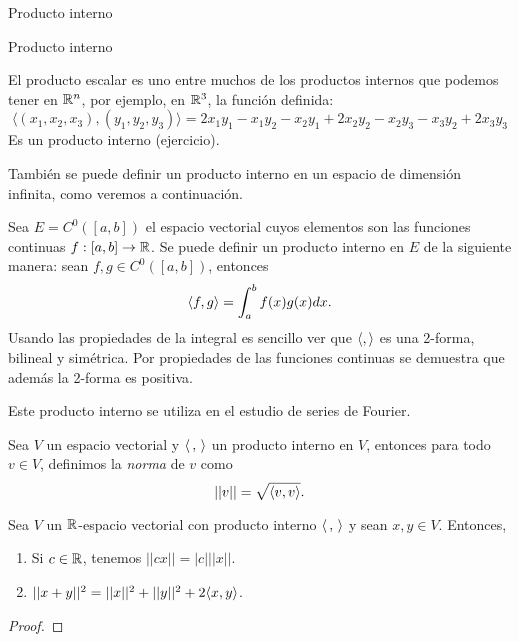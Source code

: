 \begin{chapter}{Producto interno}
\begin{section}{Producto interno}
            \begin{ejemplo*} El producto escalar es uno entre  muchos de los productos internos que podemos tener en $\mathbb R^n$, por ejemplo,  en $\mathbb R^3$,  la función definida:
                \begin{equation*}
                    \langle (x_1,x_2,x_3) , (y_1,y_2,y_3)\rangle =2x_1y_1-x_1y_2-x_2y_1+2x_2y_2-x_2y_3-x_3y_2+2x_3y_3
                \end{equation*}
                Es un producto interno (ejercicio).
            \end{ejemplo*}
        
        \begin{ejemplo*} También  se puede definir un producto interno en un espacio de dimensión infinita, como veremos a continuación.
            
            Sea $E = C^0([a,b])$ el espacio vectorial cuyos elementos son las funciones continuas $f: [a, b] \to\mathbb R$. Se puede definir un   producto interno en $E$ de la siguiente manera: sean $f,g \in  C^0([a,b])$,  entonces
            \begin{equation*}
            \langle f, g \rangle = \int_a^b f(x)g(x) dx.
            \end{equation*}
            Usando las propiedades de la integral es sencillo ver que $\langle , \rangle $ es una 2-forma, bilineal y simétrica. Por propiedades de las funciones continuas se demuestra que además la 2-forma es positiva. 
            
            Este producto interno se utiliza en el estudio de series de Fourier.
        \end{ejemplo*}
            
            
        \begin{definicion}
            Sea $V$  un espacio  vectorial y $\langle \,,\,\rangle$ un producto interno en $V$, entonces para todo $v \in V$, definimos la \textit{norma} de $v$ como 
            $$
            ||v|| = \sqrt{\langle v,v\rangle}.
            $$
        \end{definicion}
        
        \begin{proposicion} Sea $V$  un $\mathbb R$-espacio vectorial con producto interno $\langle \,,\,\rangle$ y sean  $x,y \in V$. Entonces, 
            \begin{enumerate}
                \item\label{prop-pi-2} Si $c \in \mathbb R$, tenemos $||cx|| = |c|||x||$.
                \item\label{prop-pi-3} $||x+y||^2 = ||x||^2 + ||y||^2 + 2\langle x,y\rangle$. 
            \end{enumerate}
        \end{proposicion}
        \begin{proof}
            

\end{proof}
\end{section}
\end{chapter}
